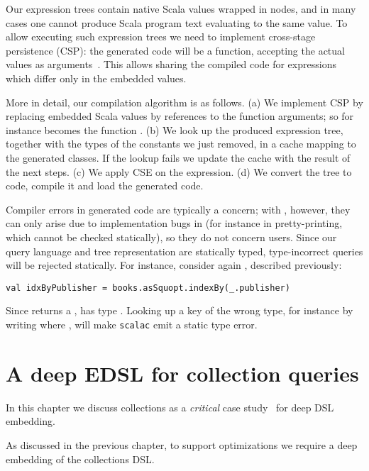 Our expression trees contain native Scala values wrapped in  nodes,
and in many cases one cannot produce Scala program text evaluating to the same value.
To allow executing such expression trees we need to implement cross-stage
persistence (CSP): the generated code will be a function, accepting the actual
values as arguments~\citep{rompf2010lightweight}. This allows sharing the compiled
code for expressions which differ only in the embedded values.

More in detail, our compilation algorithm is as follows.
(a) We implement CSP by replacing embedded Scala values by references to the
function arguments; so for instance  becomes
the function .
(b) We look up the produced expression tree, together with the types of the
constants we just removed, in a cache mapping to the generated classes. If the
lookup fails we update the cache with the result of the next steps.
(c) We apply CSE on the expression.
(d) We convert the tree to code, compile it and load the generated code.

Compiler errors in generated code are typically a concern; with \LoS{}, however,
they can only arise due to implementation bugs in \LoS{} (for instance in
pretty-printing, which cannot be checked statically), so they do not concern
users.
Since our query language and tree representation are statically typed,
type-incorrect queries will be rejected statically.
For instance, consider again , described previously:
\begin{lstlisting}
val idxByPublisher = books.asSquopt.indexBy(_.publisher)
\end{lstlisting}
Since  returns a ,  has
type . Looking up a key of the wrong type, for
instance by writing  where , will
make \texttt{scalac} emit a static type error.

\chapter{A deep EDSL for collection queries}
\label{ch:aosd13-caseStudy}
\label{sec:caseStudy}
In this chapter we discuss collections as a \emph{critical} case
study~\citep{flyvbjerg06five} for deep DSL embedding.

As discussed in the previous chapter, to support optimizations we require a deep embedding of the collections DSL\@.

